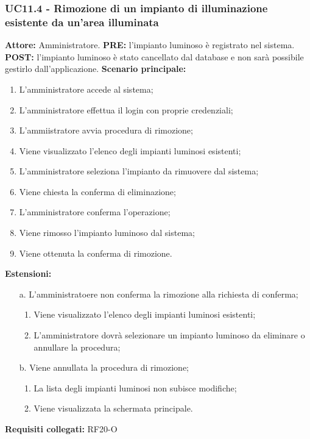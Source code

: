 \documentclass[a4paper, 12pt]{article}
\begin{document}
\subsubsection{UC11.4 - Rimozione di un impianto di illuminazione esistente da un'area illuminata}
\textbf{Attore:} Amministratore.\newline
\textbf{PRE:} l'impianto luminoso è registrato nel sistema.\newline
\textbf{POST:} l'impianto luminoso è stato cancellato dal database e non sarà possibile gestirlo dall'applicazione.\newline
\textbf{Scenario principale:}
\begin{enumerate}
    \item L'amministratore accede al sistema;
    \item L'amministratore effettua il login con proprie credenziali;
    \item L'ammiistratore avvia procedura di rimozione;
    \item Viene visualizzato l'elenco degli impianti luminosi esistenti;
    \item L'amministratore seleziona l'impianto da rimuovere dal sistema;
    \item Viene chiesta la conferma di eliminazione;
    \item L'amministratore conferma l'operazione;
    \item Viene rimosso l'impianto luminoso dal sistema;
    \item Viene ottenuta la conferma di rimozione.
\end{enumerate}
\textbf{Estensioni:}
\begin{itemize}
    \item [a.] L'amministratoere non conferma la rimozione alla richiesta di conferma;
          \begin{enumerate}
              \item Viene visualizzato l'elenco degli impianti luminosi esistenti;
              \item L'amministratore dovrà selezionare un impianto luminoso da eliminare o annullare la procedura;
          \end{enumerate}
    \item [b.] Viene annullata la procedura di rimozione;
          \begin{enumerate}
              \item La lista degli impianti luminosi non subisce modifiche;
              \item Viene visualizzata la schermata principale.
          \end{enumerate}
\end{itemize}
\textbf{Requisiti collegati:} RF20-O\newline
\end{document}
